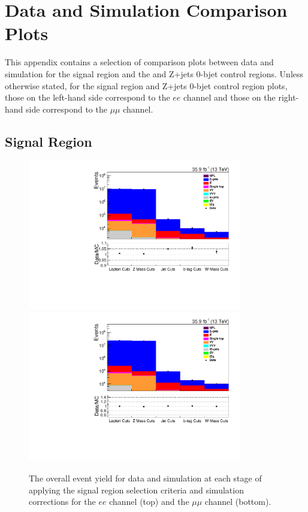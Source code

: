 \chapter{Data and Simulation Comparison Plots}\label{app:plots}
This appendix contains a selection of comparison plots between data and simulation for the signal region and the \ttbar and Z+jets 0-bjet control regions.
Unless otherwise stated, for the signal region and Z+jets 0-bjet control region plots, those on the left-hand side correspond to the $ee$ channel and those on the right-hand side correspond to the $\mu\mu$ channel.

\clearpage
\newpage

\section{Signal Region}\label{appSec:signalRegionPlots}
\begin{figure}[ht]
\centering
\includegraphics[width=0.83\textwidth]{figs/background-estimation/plots/unblinded/prompt_ee_ttbarInc/cutFlow_log.pdf}
\\
\includegraphics[width=0.83\textwidth]{figs/background-estimation/plots/unblinded/prompt_mumu_ttbarInc/cutFlow_log.pdf}
\caption{
The overall event yield for data and simulation at each stage of applying the signal region selection criteria and simulation corrections for the $ee$ channel (top) and the $\mu\mu$ channel (bottom).
}
\label{fig:SR_cutFlow}
\end{figure}

